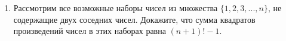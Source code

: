 \documentclass{article}
\begin{document}
\begin{enumerate}[label*=\protect\fbox{\arabic{enumi}}]
\item Рассмотрим все возможные наборы чисел из множества $\{1, 2, 3, . . . , n\}$, не содержащие двух соседних чисел. Докажите, что сумма квадратов произведений чисел в этих наборах равна $(n + 1)! - 1$.
%
%
%
%
%
%
%
	
\end{enumerate}
\end{document}
